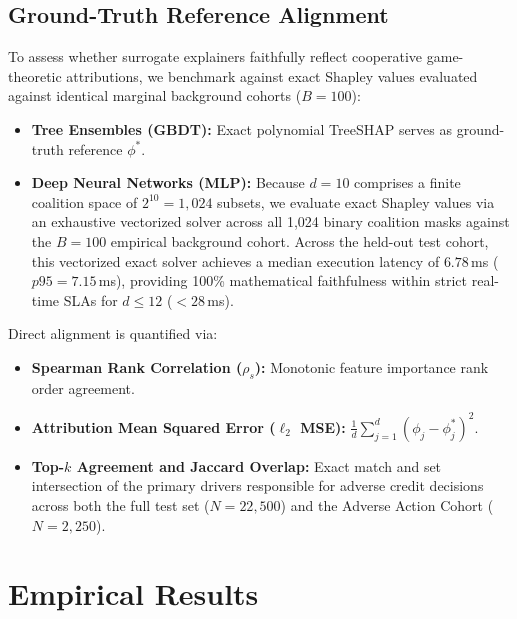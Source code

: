 \documentclass[conference]{IEEEtran}
\begin{document}
\subsection{Ground-Truth Reference Alignment}
To assess whether surrogate explainers faithfully reflect cooperative game-theoretic attributions, we benchmark against exact Shapley values evaluated against identical marginal background cohorts ($B=100$):
\begin{itemize}
    \item \textbf{Tree Ensembles (GBDT):} Exact polynomial TreeSHAP \cite{lundberg2020local} serves as ground-truth reference $\phi^*$.
    \item \textbf{Deep Neural Networks (MLP):} Because $d=10$ comprises a finite coalition space of $2^{10} = 1,024$ subsets, we evaluate exact Shapley values via an exhaustive vectorized solver across all 1,024 binary coalition masks against the $B=100$ empirical background cohort. Across the held-out test cohort, this vectorized exact solver achieves a median execution latency of $6.78$\,ms ($p95 = 7.15$\,ms), providing 100\% mathematical faithfulness within strict real-time SLAs for $d \le 12$ ($<28$\,ms).
\end{itemize}
Direct alignment is quantified via:
\begin{itemize}
    \item \textbf{Spearman Rank Correlation ($\rho_s$):} Monotonic feature importance rank order agreement.
    \item \textbf{Attribution Mean Squared Error ($\ell_2$ MSE):} $\frac{1}{d}\sum_{j=1}^d (\phi_j - \phi_j^*)^2$.
    \item \textbf{Top-$k$ Agreement and Jaccard Overlap:} Exact match and set intersection of the primary drivers responsible for adverse credit decisions across both the full test set ($N=22,500$) and the Adverse Action Cohort ($N=2,250$).
\end{itemize}

\section{Empirical Results}
\end{document}
